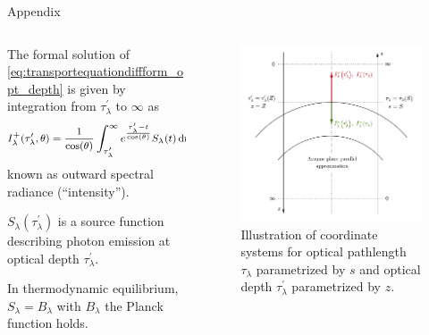 \documentclass{beamer}
\begin{document}
\begin{frame}[allowframebreaks]{Appendix}
	\begin{columns}
		\begin{column}{0.59\textwidth}
			The formal solution of \cref{eq:transportequationdiffform_opt_depth} is given by integration from $\tau_\lambda^\prime$ to $\infty$ as
			\begin{gather}\footnotesize\begin{gathered}\label{eq:formaltransferequationoutward_depth}
					I^+_\lambda(\tau^\prime_\lambda, \theta) = \frac{1}{\cos(\theta)}\int_{\tau^\prime_\lambda}^{\infty} e^{\frac{\tau_\lambda^\prime - t}{\cos(\theta)}}S_\lambda(t)\,\mathrm{d}t,
			\end{gathered}\end{gather} known as outward spectral radiance (``intensity'').
			
			$S_\lambda(\tau_\lambda^\prime)$ is a source function describing photon emission at optical depth $\tau_\lambda^\prime$. 
			
			In thermodynamic equilibrium, $S_\lambda = B_\lambda$ with $B_\lambda$ the Planck function holds. 
		\end{column}
		
		\begin{column}{0.41\textwidth}
			\begin{figure}[h!]
				\centering
				\includegraphics[width=\textwidth]{figures/thesis/outward-inward-radiation.pdf}
				\caption{Illustration of coordinate systems for optical pathlength $\tau_\lambda$ parametrized by $s$ and optical depth $\tau_\lambda^\prime$ parametrized by $z$.}
				\label{fig:outward-inward-radiation}
			\end{figure}
		\end{column}
	\end{columns}
\end{frame}
\end{document}
